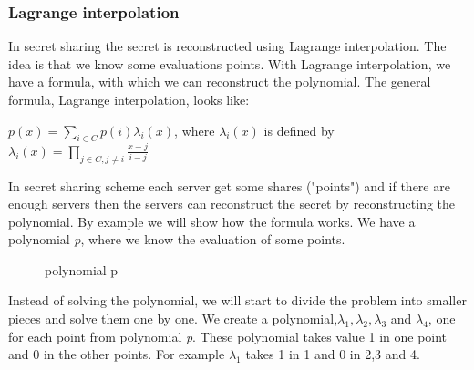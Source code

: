 \subsubsection{Lagrange interpolation} \label{sec:shamir_secret_sharing_lagrange_interpolation}
In secret sharing the secret is reconstructed using Lagrange interpolation. The idea is that we know some evaluations points. With Lagrange interpolation, we have a formula, with which we can reconstruct the polynomial.
The general formula, Lagrange interpolation, looks like:

\begin{defi}
\begin{math}p(x)=\sum\limits_{i \in C} p(i)\lambda_i(x)\end{math}, where $\lambda_i(x)$ is defined by \begin{math} \lambda_i(x)=\prod\limits_{j\in C,j\neq i}  \frac{x-j}{i-j} \end{math}
\end{defi}

\noindent
In secret sharing scheme each server get some shares ("points") and if there are enough servers then the servers can reconstruct the secret by reconstructing the polynomial. By example we will show how the formula works.  We have a polynomial \textit{p}, where we know the evaluation of some points.

\begin{figure}[H]
    \centering
    \caption{polynomial p}
\end{figure}

\noindent
Instead of solving the polynomial, we will start to divide the problem into smaller pieces and solve them one by one. We create a polynomial,\begin{math} \lambda_1, \lambda_2, \lambda_3\end{math} and \begin{math}\lambda_4\end{math}, one for each point from polynomial \textit{p}. These polynomial takes value 1 in one point and 0 in the other points. For example \begin{math} \lambda_1\end{math} takes 1 in 1 and 0 in 2,3 and 4.

